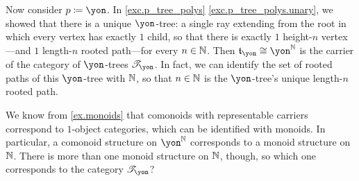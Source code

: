 \documentclass[Book-Poly]{subfiles}
\begin{document}
\begin{example} \label{ex.yon_tree_nn}
Now consider $p\coloneqq\yon$.
In \cref{exc.p_tree_polys} \cref{exc.p_tree_polys.unary}, we showed that there is a unique $\yon$-tree: a single ray extending from the root in which every vertex has exactly $1$ child, so that there is exactly $1$ height-$n$ vertex---and $1$ length-$n$ rooted path---for every $n\in\mathbb{N}$.
Then $\ema{t}_\yon\iso\yon^\nn$ is the carrier of the category of $\yon$-trees $\cofree\yon$.
In fact, we can identify the set of rooted paths of this $\yon$-tree with $\mathbb{N}$, so that $n\in\mathbb{N}$ is the $\yon$-tree's unique length-$n$ rooted path.

We know from \cref{ex.monoids} that comonoids with representable carriers correspond to $1$-object categories, which can be identified with monoids.
In particular, a comonoid structure on $\yon^\nn$ corresponds to a monoid structure on $\mathbb{N}$.
There is more than one monoid structure on $\mathbb{N}$, though, so which one corresponds to the category $\cofree\yon$?


\end{example}
\end{document}
